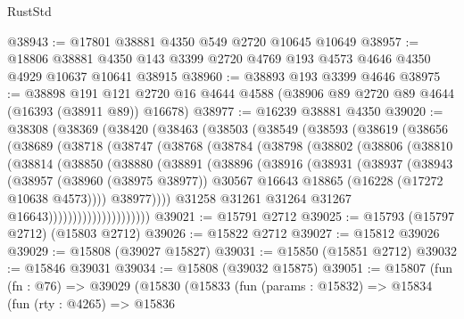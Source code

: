 \begin{lexlean}{RustStd}
\begin{coremodule}
@38943 := @17801 @38881 @4350 @549 @2720 @10645 @10649
@38957 := @18806
    @38881
    @4350
    @143
    @3399
    @2720
    @4769
    @193
    @4573
    @4646
    @4350
    @4929
    @10637
    @10641
    @38915
@38960 := @38893 @193 @3399 @4646
@38975 := @38898
    @191
    @121
    @2720
    @16
    @4644
    @4588
    (@38906 @89 @2720 @89 @4644 (@16393 (@38911 @89)) @16678)
@38977 := @16239 @38881 @4350
@39020 := @38308
    (@38369
      (@38420
        (@38463
          (@38503
            (@38549
              (@38593
                (@38619
                  (@38656
                    (@38689
                      (@38718
                        (@38747
                          (@38768
                            (@38784
                              (@38798
                                (@38802
                                  (@38806
                                    (@38810
                                      (@38814
                                        (@38850
                                          (@38880
                                            (@38891
                                              (@38896
                                                (@38916
                                                  (@38931
                                                    (@38937
                                                      (@38943
                                                        (@38957
                                                          (@38960 (@38975 @38977))
                                                          @30567
                                                          @16643
                                                          @18865
                                                          (@16228 (@17272 @10638 @4573))))
                                                      @38977))))
                                              @31258
                                              @31261
                                              @31264
                                              @31267
                                              @16643)))))))))))))))))))))
@39021 := @15791 @2712
@39025 := @15793 (@15797 @2712) (@15803 @2712)
@39026 := @15822 @2712
@39027 := @15812 @39026
@39029 := @15808 (@39027 @15827)
@39031 := @15850 (@15851 @2712)
@39032 := @15846 @39031
@39034 := @15808 (@39032 @15875)
@39051 := @15807
    (fun (fn : @76) =>
    @39029
      (@15830
        (@15833
          (fun (params : @15832) =>
          @15834
            (fun (rty : @4265) =>
            @15836

\end{coremodule}
\end{lexlean}
